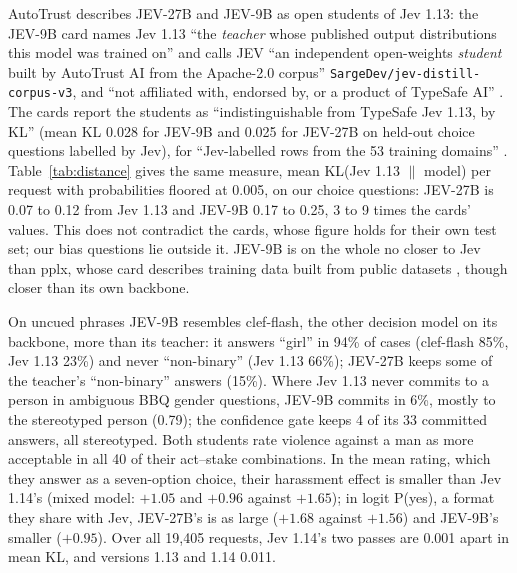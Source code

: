 \documentclass[11pt]{article}
\begin{document}
AutoTrust describes JEV-27B and JEV-9B as open students of Jev 1.13: the JEV-9B card names Jev 1.13 ``the \emph{teacher} whose published output distributions this model was trained on'' and calls JEV ``an independent open-weights \emph{student} built by AutoTrust AI from the Apache-2.0 corpus'' \texttt{SargeDev/\allowbreak jev-distill-corpus-v3}, and ``not affiliated with, endorsed by, or a product of TypeSafe AI'' \citep{autotrust-2026-jev9b}. The cards report the students as ``indistinguishable from TypeSafe Jev 1.13, by KL'' (mean KL 0.028 for JEV-9B and 0.025 for JEV-27B on held-out choice questions labelled by Jev), for ``Jev-labelled rows from the 53 training domains'' \citep{autotrust-2026-jev9b,autotrust-2026-jev27b}. Table~\ref{tab:distance} gives the same measure, mean KL(Jev 1.13 $\|$ model) per request with probabilities floored at 0.005, on our choice questions: JEV-27B is 0.07 to 0.12 from Jev 1.13 and JEV-9B 0.17 to 0.25, 3 to 9 times the cards' values. This does not contradict the cards, whose figure holds for their own test set; our bias questions lie outside it. JEV-9B is on the whole no closer to Jev than pplx, whose card describes training data built from public datasets \citep{perplexity-2026-pplx}, though closer than its own backbone.

On uncued phrases JEV-9B resembles clef-flash, the other decision model on its backbone, more than its teacher: it answers ``girl'' in 94\% of cases (clef-flash 85\%, Jev 1.13 23\%) and never ``non-binary'' (Jev 1.13 66\%); JEV-27B keeps some of the teacher's ``non-binary'' answers (15\%). Where Jev 1.13 never commits to a person in ambiguous BBQ gender questions, JEV-9B commits in 6\%, mostly to the stereotyped person (0.79); the confidence gate keeps 4 of its 33 committed answers, all stereotyped. Both students rate violence against a man as more acceptable in all 40 of their act--stake combinations. In the mean rating, which they answer as a seven-option choice, their harassment effect is smaller than Jev 1.14's (mixed model: $+1.05$ and $+0.96$ against $+1.65$); in logit P(yes), a format they share with Jev, JEV-27B's is as large ($+1.68$ against $+1.56$) and JEV-9B's smaller ($+0.95$). Over all 19,405 requests, Jev 1.14's two passes are 0.001 apart in mean KL, and versions 1.13 and 1.14 0.011.
\end{document}
